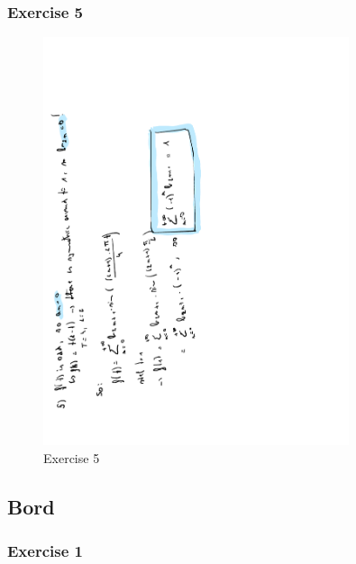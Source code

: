 \documentclass[a4paper]{report}
\begin{document}
\subsubsection{Exercise 5}

\begin{figure}[H]
	\centering
	\includegraphics[angle=-90, width=0.8\textwidth]{assets/wc_9_ex_5.pdf}
	\caption{Exercise 5}
\end{figure}

\subsection{Bord}

\subsubsection{Exercise 1}
\end{document}
